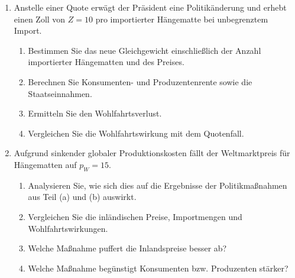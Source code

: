 \begin{question}
\begin{enumerate}
		\item Anstelle einer Quote erwägt der Präsident eine Politikänderung und erhebt einen Zoll von \( Z = 10 \) pro importierter Hängematte bei unbegrenztem Import.
		      \begin{enumerate}
			      \item Bestimmen Sie das neue Gleichgewicht einschließlich der Anzahl importierter Hängematten und des Preises.
			      \item Berechnen Sie Konsumenten- und Produzentenrente sowie die Staatseinnahmen.
			      \item Ermitteln Sie den Wohlfahrtsverlust.
			      \item Vergleichen Sie die Wohlfahrtswirkung mit dem Quotenfall.
		      \end{enumerate}

		\item Aufgrund sinkender globaler Produktionskosten fällt der Weltmarktpreis für Hängematten auf \( p_W = 15 \).
		      \begin{enumerate}
			      \item Analysieren Sie, wie sich dies auf die Ergebnisse der Politikmaßnahmen aus Teil (a) und (b) auswirkt.
			      \item Vergleichen Sie die inländischen Preise, Importmengen und Wohlfahrtswirkungen.
			      \item Welche Maßnahme puffert die Inlandspreise besser ab?
			      \item Welche Maßnahme begünstigt Konsumenten bzw. Produzenten stärker?
		      \end{enumerate}

	\end{enumerate}

\end{question}


